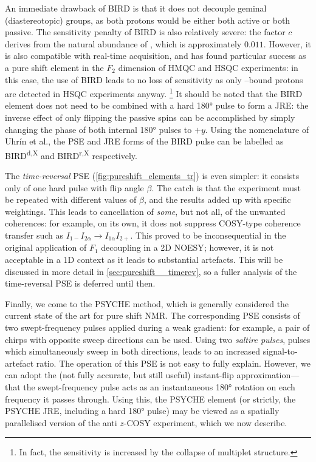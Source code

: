 An immediate drawback of BIRD is that it does not decouple geminal (diastereotopic)  groups, as both protons would be either both active or both passive.
The sensitivity penalty of BIRD is also relatively severe: the factor $c$ derives from the natural abundance of \carbon{}, which is approximately $0.011$.
However, it is also compatible with real-time acquisition\autocite{Lupulescu2012JMR}, and has found particular success as a pure shift element in the $F_2$ dimension of HMQC and HSQC experiments\autocite{Sakhaii2009JMR,Paudel2013ACIE,Reinsperger2014JMR,Kiraly2018MRC,Nolis2019JMR_psHSQC,Singh2020JMR}: in this case, the use of BIRD leads to no loss of sensitivity as only \carbon{}--bound protons are detected in HSQC experiments anyway.%
\footnote{In fact, the sensitivity is increased by the collapse of multiplet structure.}
It should be noted that the BIRD element does not need to be combined with a hard \ang{180} pulse to form a JRE: the inverse effect of only flipping the passive spins can be accomplished by simply changing the phase of both internal \ang{180} pulses to $+y$.
Using the nomenclature of Uhr{\'i}n et al.,\autocite{Uhrin1993JMRSA} the PSE and JRE forms of the BIRD pulse can be labelled as BIRD\textsuperscript{d,X} and BIRD\textsuperscript{r,X} respectively.

The \textit{time-reversal} PSE (\cref{fig:pureshift_elements_tr}) is even simpler: it consists only of one hard pulse with flip angle $\beta$\autocite{Sorensen1985JACS}.
The catch is that the experiment must be repeated with different values of $\beta$, and the results added up with specific weightings.\autocite{Griesinger1986JCP}
This leads to cancellation of \textit{some}, but not all, of the unwanted coherences: for example, on its own, it does not suppress COSY-type coherence transfer such as $I_{1-}I_{2\alpha} \to I_{1\alpha}I_{2+}$.
This proved to be inconsequential in the original application of $F_1$ decoupling in a 2D NOESY\autocite{Sorensen1985JACS}; however, it is not acceptable in a 1D context as it leads to substantial artefacts.
This will be discussed in more detail in \cref{sec:pureshift__timerev}, so a fuller analysis of the time-reversal PSE is deferred until then.

Finally, we come to the PSYCHE method, which is generally considered the current state of the art for pure shift NMR.\autocite{Foroozandeh2014ACIE}
The corresponding PSE consists of two swept-frequency pulses applied during a weak gradient: for example, a pair of chirps with opposite sweep directions can be used.
Using two \textit{saltire pulses}, pulses which simultaneously sweep in both directions, leads to an increased signal-to-artefact ratio\autocite{Foroozandeh2018CEJ}.
The operation of this PSE is not easy to fully explain\autocite{Foroozandeh2020JMR}. However, we can adopt the (not fully accurate, but still useful) instant-flip approximation\autocite{Zwahlen1997JACS,Kupce2007JMR}---that the swept-frequency pulse acts as an instantaneous \ang{180} rotation on each frequency it passes through.
Using this, the PSYCHE element (or strictly, the PSYCHE JRE, including a hard \ang{180} pulse) may be viewed as a spatially parallelised version of the anti $z$-COSY experiment\autocite{Oschkinat1986JMR,Pell2007MRC}, which we now describe.
